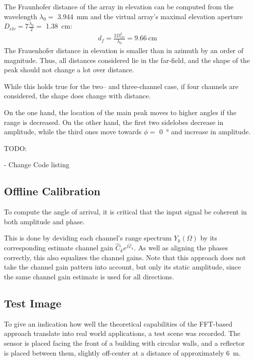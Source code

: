 The Fraunhofer distance of the array in elevation can be computed from the wavelength $\lambda_0=$ \SIlist{3.944}{\mm}
and the virtual array's maximal elevation aperture $D_{elv} = 7 \frac{\lambda_0}{2}=$ \SI{1.38}{\cm}:
\begin{align}
    d_f  = \frac{2D_{elv}^2}{\lambda_0}
    = \SI{9.66}{\cm}
\end{align}
The Frauenhofer distance in elevation is smaller than in azimuth by an order of magnitude.
Thus, all distances considered lie in the far-field,
and the shape of the peak should not change a lot over distance.

While this holds true for the two-- and three-channel case, if four channels are considered,
the shape does change with distance.

On the one hand, the location of the main peak moves to higher angles if the range is decreased.
On the other hand, the first two sidelobes decrease in amplitude,
while the third ones move towards $\phi=$ \SI{0}{\degree} and increase in amplitude.

TODO:

- Change Code listing

\subsection{Offline Calibration}
To compute the angle of arrival, it is critical that the input signal be coherent in both amplitude and phase.

This is done by deviding each channel's range spectrum $Y_k(\Omega)$ by its corresponding estimate channel gain $\hat C_k e^{j\hat \varphi_k}$.
As well as aligning the phases correctly, this also equalizes the channel gains.
Note that this approach does not take the channel gain pattern into account, but only its static amplitude, 
since the same channel gain estimate is used for all directions. \\


\subsection{Test Image}
\label{sec:fft_result}
To give an indication how well the theoretical capabilities of the FFT-based approach translate into real world applications,
a test scene was recorded. The sensor is placed facing the front of a building with circular walls, and
a reflector is placed between them, slightly off-center at a distance of approximately \SI{6}{\m}.

